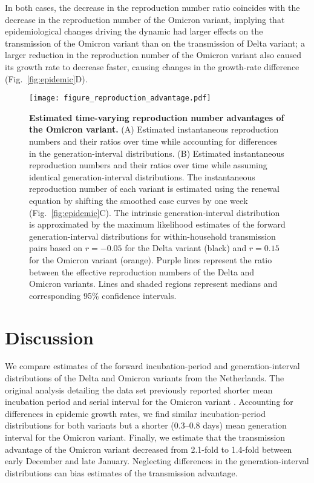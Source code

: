 \documentclass[12pt]{article}
\newcommand{\fref}[1]{Fig.~\ref{fig:#1}}
\begin{document}
In both cases, the decrease in the reproduction number ratio coincides with the decrease in the reproduction number of the Omicron variant, implying that epidemiological changes driving the dynamic had larger effects on the transmission of the Omicron variant than on the transmission of Delta variant;
a larger reduction in the reproduction number of the Omicron variant also caused its growth rate to decrease faster, causing changes in the growth-rate difference (\fref{epidemic}D).

\begin{figure}[!th]
\texttt{[image: figure\_reproduction\_advantage.pdf]}
\caption{
\textbf{Estimated time-varying reproduction number advantages of the Omicron variant.}
(A) Estimated instantaneous reproduction numbers and their ratios over time while accounting for differences in the generation-interval distributions.
(B) Estimated instantaneous reproduction numbers and their ratios over time while assuming identical generation-interval distributions.
The instantaneous reproduction number of each variant is estimated using the renewal equation by shifting the smoothed case curves by one week (\fref{epidemic}C).
The intrinsic generation-interval distribution is approximated by the maximum likelihood estimates of the forward generation-interval distributions for within-household transmission pairs based on $r=-0.05$ for the Delta variant (black) and $r=0.15$ for the Omicron variant (orange).
Purple lines represent the ratio between the effective reproduction numbers of the Delta and Omicron variants.
Lines and shaded regions represent medians and corresponding 95\% confidence intervals.
\label{fig:reproduction}
}
\end{figure}

\section{Discussion}

We compare estimates of the forward incubation-period and generation-interval distributions of the Delta and Omicron variants from the Netherlands.
The original analysis detailing the data set previously reported shorter mean incubation period and serial interval for the Omicron variant \citep{backer2021omicron}.
Accounting for differences in epidemic growth rates, we find similar incubation-period distributions for both variants but a shorter (0.3--0.8 days) mean generation interval for the Omicron variant.
Finally, we estimate that the transmission advantage of the Omicron variant decreased from 2.1-fold to 1.4-fold between early December and late January. 
Neglecting differences in the generation-interval distributions can bias estimates of the transmission advantage.
\end{document}
